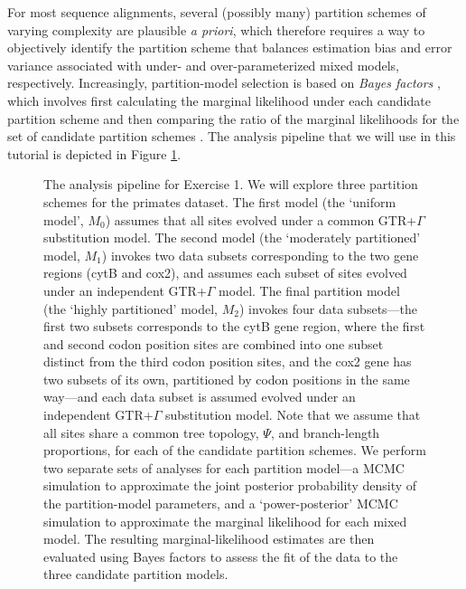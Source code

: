 For most sequence alignments, several (possibly many) partition schemes of varying complexity are plausible \emph{a priori}, which therefore requires a way to objectively identify the partition scheme that balances estimation bias and error variance associated with under- and over-parameterized mixed models, respectively.
Increasingly, partition-model selection is based on \textit{Bayes factors} \citep[\EG][]{Suchard2001}, which involves first calculating the marginal likelihood under each candidate partition scheme and then comparing the ratio of the marginal likelihoods for the set of candidate partition schemes \citep{Brandley2005,Nylander2004,Mcguire2007}.
The analysis pipeline that we will use in this tutorial is depicted in Figure \ref{fig:pipeline}.

\begin{figure}[ht!]
\centering
{}
\caption{\small The analysis pipeline for Exercise 1. We will explore three partition schemes for the primates dataset.
The first model (the `uniform model', $M_0$) assumes that all sites evolved under a common GTR+$\Gamma$ substitution model.
The second model (the `moderately partitioned' model, $M_1$) invokes two data subsets corresponding to the two gene regions (cytB and cox2), and assumes each subset of sites evolved under an independent GTR+$\Gamma$ model.
The final partition model (the `highly partitioned' model, $M_2$) invokes four data subsets---the first two subsets corresponds to the cytB gene region, where the first and second codon position sites are combined into one subset distinct from the third codon position sites, and the cox2 gene has two subsets of its own, partitioned by codon positions in the same way---and each data subset is assumed evolved under an independent GTR+$\Gamma$ substitution model.
Note that we assume that all sites share a common tree topology, $\Psi$, and branch-length proportions, for each of the candidate partition schemes.
We perform two separate sets of analyses for each partition model---a MCMC simulation to approximate the joint posterior probability density of the partition-model parameters, and a `power-posterior' MCMC simulation to approximate the marginal likelihood for each mixed model.
The resulting marginal-likelihood estimates are then evaluated using Bayes factors to assess the fit of the data to the three candidate partition models.  
}
\label{fig:pipeline}
\end{figure}
\newpage



